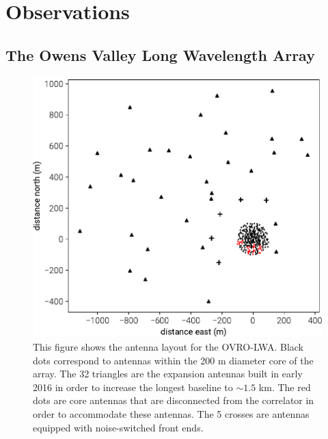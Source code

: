 \documentclass[twocolumn]{aastex61}
\begin{document}
\section{Observations}\label{sec:observations}

\subsection{The Owens Valley Long Wavelength Array}

\begin{figure}[t]
    \includegraphics[width=\columnwidth]{figures/antenna-layout/antenna-layout}
    \caption{
        This figure shows the antenna layout for the OVRO-LWA. Black dots correspond to antennas
        within the 200 m diameter core of the array. The 32 triangles are the expansion antennas
        built in early 2016 in order to increase the longest baseline to $\sim1.5$ km. The red dots
        are core antennas that are disconnected from the correlator in order to accommodate these
        antennas. The 5 crosses are antennas equipped with noise-switched front ends.
    }
    \label{fig:antenna-layout}
\end{figure}
\end{document}
